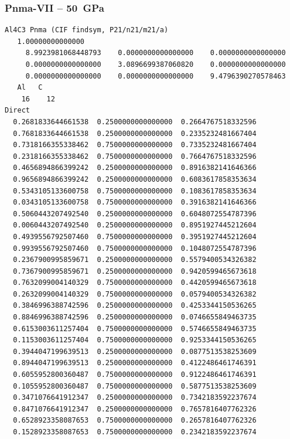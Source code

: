 \subsubsection*{Pnma-VII -- 50~GPa}
\begin{footnotesize}
\begin{verbatim}
Al4C3 Pnma (CIF findsym, P21/n21/m21/a) 
   1.00000000000000     
     8.9923981068448793    0.0000000000000000    0.0000000000000000
     0.0000000000000000    3.0896699387060820    0.0000000000000000
     0.0000000000000000    0.0000000000000000    9.4796390270578463
   Al   C 
    16    12
Direct
  0.2681833644661538  0.2500000000000000  0.2664767518332596
  0.7681833644661538  0.2500000000000000  0.2335232481667404
  0.7318166355338462  0.7500000000000000  0.7335232481667404
  0.2318166355338462  0.7500000000000000  0.7664767518332596
  0.4656894866399242  0.2500000000000000  0.8916382141646366
  0.9656894866399242  0.2500000000000000  0.6083617858353634
  0.5343105133600758  0.7500000000000000  0.1083617858353634
  0.0343105133600758  0.7500000000000000  0.3916382141646366
  0.5060443207492540  0.2500000000000000  0.6048072554787396
  0.0060443207492540  0.2500000000000000  0.8951927445212604
  0.4939556792507460  0.7500000000000000  0.3951927445212604
  0.9939556792507460  0.7500000000000000  0.1048072554787396
  0.2367900995859671  0.2500000000000000  0.5579400534326382
  0.7367900995859671  0.2500000000000000  0.9420599465673618
  0.7632099004140329  0.7500000000000000  0.4420599465673618
  0.2632099004140329  0.7500000000000000  0.0579400534326382
  0.3846996388742596  0.2500000000000000  0.4253344150536265
  0.8846996388742596  0.2500000000000000  0.0746655849463735
  0.6153003611257404  0.7500000000000000  0.5746655849463735
  0.1153003611257404  0.7500000000000000  0.9253344150536265
  0.3944047199639513  0.2500000000000000  0.0877513538253609
  0.8944047199639513  0.2500000000000000  0.4122486461746391
  0.6055952800360487  0.7500000000000000  0.9122486461746391
  0.1055952800360487  0.7500000000000000  0.5877513538253609
  0.3471076641912347  0.2500000000000000  0.7342183592237674
  0.8471076641912347  0.2500000000000000  0.7657816407762326
  0.6528923358087653  0.7500000000000000  0.2657816407762326
  0.1528923358087653  0.7500000000000000  0.2342183592237674
 

\end{verbatim}
\end{footnotesize}
